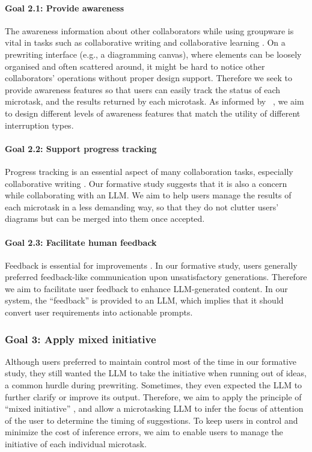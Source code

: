 \paragraph{\textbf{Goal 2.1: Provide awareness}}
The awareness information about other collaborators while using groupware \cite{gutwin2002descriptive} is vital in tasks such as collaborative writing \cite{birnholtz2013write} and collaborative learning \cite{fransen2011mediating}. On a prewriting interface (e.g., a diagramming canvas), where elements can be loosely organised and often scattered around, it might be hard to notice other collaborators' operations without proper design support. Therefore we seek to provide awareness features so that users can easily track the status of each microtask, and the results returned by each microtask.
As informed by ~\cite{gluck2007matching}, we aim to design different levels of awareness features that match the utility of different interruption types.

\paragraph{\textbf{Goal 2.2: Support progress tracking}}
Progress tracking is an essential aspect of many collaboration tasks, especially collaborative writing \cite{birnholtz2013write,birnholtz2012tracking}. Our formative study suggests that it is also a concern while collaborating with an LLM. We aim to help users manage the results of each microtask in a less demanding way, so that they do not clutter users' diagrams but can be merged into them once accepted.
\paragraph{\textbf{Goal 2.3: Facilitate human feedback}}
Feedback is essential for improvements \cite{dow2011shepherding,haug2021feeasy,huang2018feedback}. In our formative study, users generally preferred feedback-like communication upon unsatisfactory generations. Therefore we aim to facilitate user feedback to enhance LLM-generated content. In our system, the ``feedback'' is provided to an LLM, which implies that it should convert user requirements into actionable prompts.

\subsubsection*{\textbf{Goal 3: Apply mixed initiative}}
Although users preferred to maintain control most of the time in our formative study, they still wanted the LLM to take the initiative when running out of ideas, a common hurdle during prewriting. Sometimes, they even expected the LLM to further clarify or improve its output. Therefore, we aim to apply the principle of ``mixed initiative'' \cite{horvitz1999principles}, and allow a microtasking LLM to infer the focus of attention of the user to determine the timing of suggestions. To keep users in control and minimize the cost of inference errors, we aim to enable users to manage the initiative of each individual microtask. 
